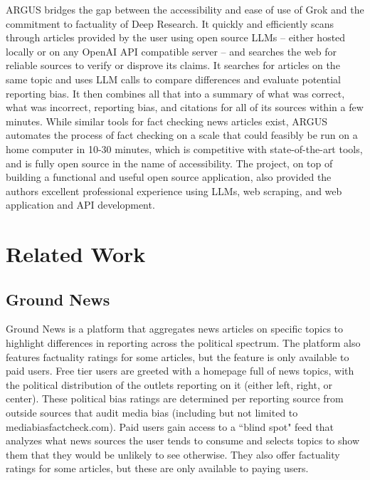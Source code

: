 \documentclass[conference]{IEEEtran}
\begin{document}
ARGUS bridges the gap between the accessibility and ease of use of Grok and the commitment to factuality of Deep Research. It quickly and efficiently scans through articles provided by the user using open source LLMs -- either hosted locally or on any OpenAI API compatible server -- and searches the web for reliable sources to verify or disprove its claims. It searches for articles on the same topic and uses LLM calls to compare differences and evaluate potential reporting bias. It then combines all that into a summary of what was correct, what was incorrect, reporting bias, and citations for all of its sources within a few minutes. While similar tools for fact checking news articles exist, ARGUS automates the process of fact checking on a scale that could feasibly be run on a home computer in 10-30 minutes, which is competitive with state-of-the-art tools, and is fully open source in the name of accessibility. The project, on top of building a functional and useful open source application, also provided the authors excellent professional experience using LLMs, web scraping, and web application and API development.

\section{Related Work}

\subsection{Ground News}
Ground News is a platform that aggregates news articles on specific topics to highlight differences in reporting across the political spectrum\cite{groundNews}. The platform also features factuality ratings for some articles, but the feature is only available to paid users\cite{groundNewsSubscriptions}. Free tier users are greeted with a homepage full of news topics, with the political distribution of the outlets reporting on it (either left, right, or center). These political bias ratings are determined per reporting source from outside sources that audit media bias (including but not limited to mediabiasfactcheck.com). Paid users gain access to a ``blind spot" feed that analyzes what news sources the user tends to consume and selects topics to show them that they would be unlikely to see otherwise. They also offer factuality ratings for some articles, but these are only available to paying users\cite{groundNews}.
\end{document}

